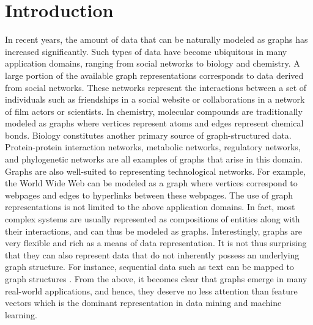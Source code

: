 \documentclass[twoside,11pt]{article}
\begin{document}
\section{Introduction}\label{Introduction}
In recent years, the amount of data that can be naturally modeled as graphs has increased significantly.
Such types of data have become ubiquitous in many application domains, ranging from social networks to biology and chemistry.
A large portion of the available graph representations corresponds to data derived from social networks.
These networks represent the interactions between a set of individuals such as friendships in a social website or collaborations in a network of film actors or scientists.
In chemistry, molecular compounds are traditionally modeled as graphs where vertices represent atoms and edges represent chemical bonds.
Biology constitutes another primary source of graph-structured data. Protein-protein interaction networks, metabolic networks, regulatory networks, and phylogenetic networks are all examples of graphs that arise in this domain.
Graphs are also well-suited to representing technological networks.
For example, the World Wide Web can be modeled as a graph where vertices correspond to webpages and edges to hyperlinks between these webpages.
The use of graph representations is not limited to the above application domains.
In fact, most complex systems are usually represented as compositions of entities along with their interactions, and can thus be modeled as graphs.
Interestingly, graphs are very flexible and rich as a means of data representation.
It is not thus surprising that they can also represent data that do not inherently possess an underlying graph structure.
For instance, sequential data such as text can be mapped to graph structures .
From the above, it becomes clear that graphs emerge in many real-world applications, and hence, they deserve no less attention than feature vectors which is the dominant representation in data mining and machine learning.
\end{document}
